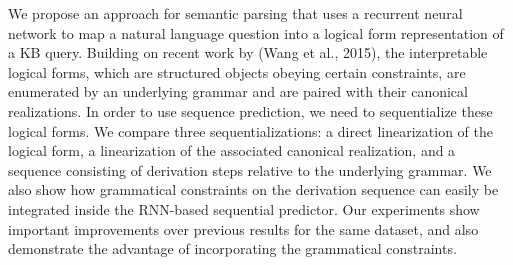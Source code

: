 We propose an approach for semantic parsing that uses a recurrent neural network to map a natural language question into a logical form representation of a KB query. Building on recent work by (Wang et al., 2015), the interpretable logical forms, which are structured objects obeying certain constraints, are enumerated by an underlying grammar and are paired with their canonical realizations. In order to use sequence prediction, we need to sequentialize these logical forms. We compare three sequentializations: a direct linearization of the logical form, a linearization of the associated canonical realization, and a sequence consisting of derivation steps relative to the underlying grammar. We also show how grammatical constraints on the derivation sequence can easily be integrated inside the RNN-based sequential predictor. Our experiments show important improvements over previous results for the same dataset, and also demonstrate the advantage of incorporating the grammatical constraints.

